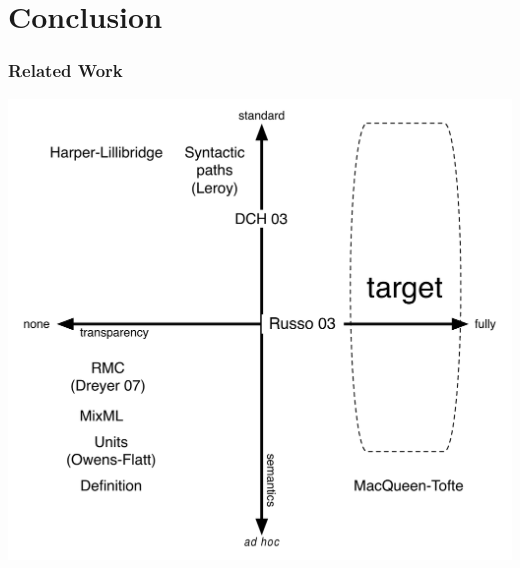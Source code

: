 \documentclass{beamer}
\begin{document}
\section{Conclusion}
\begin{frame}
\frametitle{Related Work}
\begin{center}
\includegraphics[scale=0.4]{../../../design/figs/modsys-spectrum.pdf}
\end{center}
\end{frame}
\end{document}
